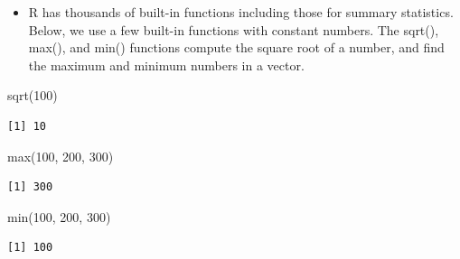 \documentclass[
  letterpaper,
  DIV=11,
  numbers=noendperiod]{scrreprt}
\newenvironment{Shaded}{\begin{snugshade}}{\end{snugshade}}
\newcommand{\DecValTok}[1]{\textcolor[rgb]{0.68,0.00,0.00}{#1}}
\newcommand{\FunctionTok}[1]{\textcolor[rgb]{0.28,0.35,0.67}{#1}}
\newcommand{\NormalTok}[1]{\textcolor[rgb]{0.00,0.23,0.31}{#1}}
\providecommand{\tightlist}{%
  \setlength{\itemsep}{0pt}\setlength{\parskip}{0pt}}\usepackage{longtable,booktabs,array}
\begin{document}
\begin{itemize}
\tightlist
\item
  R has thousands of built-in functions including those for summary
  statistics. Below, we use a few built-in functions with constant
  numbers. The sqrt(), max(), and min() functions compute the square
  root of a number, and find the maximum and minimum numbers in a
  vector.
\end{itemize}

\begin{Shaded}
\begin{Highlighting}[]
\FunctionTok{sqrt}\NormalTok{(}\DecValTok{100}\NormalTok{)}
\end{Highlighting}
\end{Shaded}

\begin{verbatim}
[1] 10
\end{verbatim}

\begin{Shaded}
\begin{Highlighting}[]
\FunctionTok{max}\NormalTok{(}\DecValTok{100}\NormalTok{, }\DecValTok{200}\NormalTok{, }\DecValTok{300}\NormalTok{)}
\end{Highlighting}
\end{Shaded}

\begin{verbatim}
[1] 300
\end{verbatim}

\begin{Shaded}
\begin{Highlighting}[]
\FunctionTok{min}\NormalTok{(}\DecValTok{100}\NormalTok{, }\DecValTok{200}\NormalTok{, }\DecValTok{300}\NormalTok{)}
\end{Highlighting}
\end{Shaded}

\begin{verbatim}
[1] 100
\end{verbatim}
\end{document}
